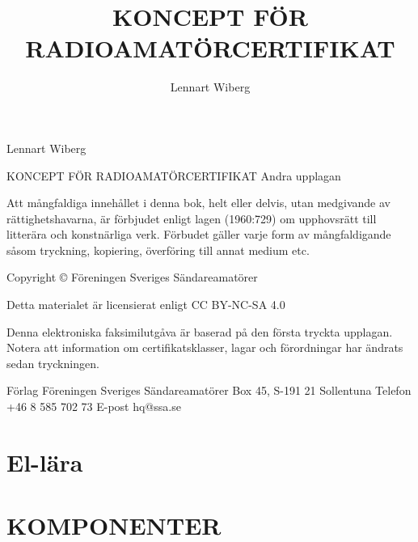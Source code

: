 \documentclass[a4paper,twoside,twocolumn,openright]{book}
\begin{document}
\frontmatter
\title{KONCEPT FÖR RADIOAMATÖRCERTIFIKAT}
\author{Lennart Wiberg}
\maketitle

Lennart Wiberg

KONCEPT FÖR RADIOAMATÖRCERTIFIKAT
Andra upplagan

Att mångfaldiga innehållet i denna bok, helt eller delvis, utan medgivande av
rättighetshavarna, är förbjudet enligt lagen (1960:729) om upphovsrätt till
litterära och konstnärliga verk. Förbudet gäller varje form av mångfaldigande
såsom tryckning, kopiering, överföring till annat medium etc.

Copyright © Föreningen Sveriges Sändareamatörer

Detta materialet är licensierat enligt CC BY-NC-SA 4.0

Denna elektroniska faksimilutgåva är baserad på den första tryckta
upplagan. Notera att information om certifikatsklasser, lagar och
förordningar har ändrats sedan tryckningen.


Förlag
Föreningen Sveriges Sändareamatörer
Box 45, S-191 21 Sollentuna
Telefon +46 8 585 702 73
E-post hq@ssa.se


\tableofcontents

\mainmatter










\chapter{El-lära}


\cleardoublepage

\cleardoublepage

\cleardoublepage

\cleardoublepage

\cleardoublepage

\cleardoublepage

\cleardoublepage

\cleardoublepage


\chapter{KOMPONENTER}

\cleardoublepage

\cleardoublepage

\cleardoublepage

\cleardoublepage

\cleardoublepage

\cleardoublepage

\cleardoublepage

\cleardoublepage

\end{document}
